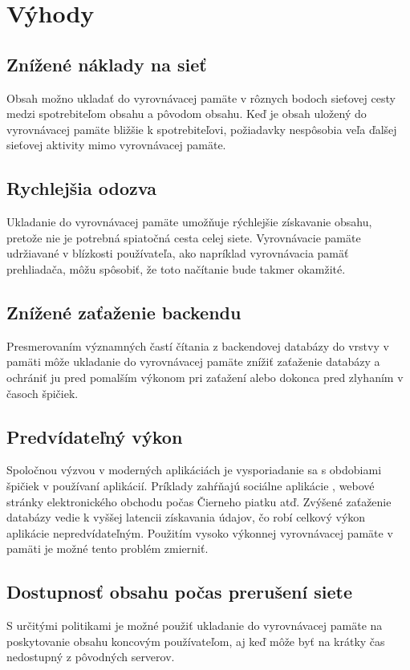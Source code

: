 \documentclass[10pt,oneside,slovak,a4paper]{article}
\begin{document}
\section{Výhody}

\subsection{Znížené náklady na sieť}
\quad
Obsah možno\cite{MILD} ukladať do vyrovnávacej pamäte v rôznych bodoch sieťovej cesty medzi spotrebiteľom obsahu a pôvodom obsahu. Keď je obsah uložený do vyrovnávacej pamäte bližšie k spotrebiteľovi, požiadavky nespôsobia veľa ďalšej sieťovej aktivity mimo vyrovnávacej pamäte.
\subsection{Rychlejšia odozva}
\quad
Ukladanie do vyrovnávacej pamäte umožňuje rýchlejšie získavanie obsahu, pretože nie je potrebná spiatočná cesta celej siete. Vyrovnávacie pamäte udržiavané v blízkosti používateľa, ako napríklad vyrovnávacia pamäť prehliadača, môžu spôsobiť, že toto načítanie bude takmer okamžité.


\subsection{Znížené zaťaženie backendu}
\quad Presmerovaním významných častí čítania z backendovej databázy do vrstvy v pamäti môže ukladanie do vyrovnávacej pamäte znížiť zaťaženie  databázy a ochrániť ju pred pomalším výkonom pri zaťažení alebo dokonca pred zlyhaním v časoch špičiek.

\subsection{Predvídateľný výkon}
\quad Spoločnou výzvou v moderných aplikáciách je vysporiadanie sa s obdobiami špičiek v používaní aplikácií. Príklady zahŕňajú sociálne aplikácie , webové stránky elektronického obchodu počas Čierneho piatku atď. Zvýšené zaťaženie databázy vedie k vyššej latencii získavania údajov, čo robí celkový výkon aplikácie nepredvídateľným. Použitím vysoko výkonnej vyrovnávacej pamäte v pamäti je možné tento problém zmierniť.

\subsection{Dostupnosť obsahu počas prerušení siete}
\quad
S určitými politikami je možné použiť ukladanie do vyrovnávacej pamäte na poskytovanie obsahu koncovým používateľom, aj keď môže byť na krátky čas nedostupný z pôvodných serverov.
\end{document}
